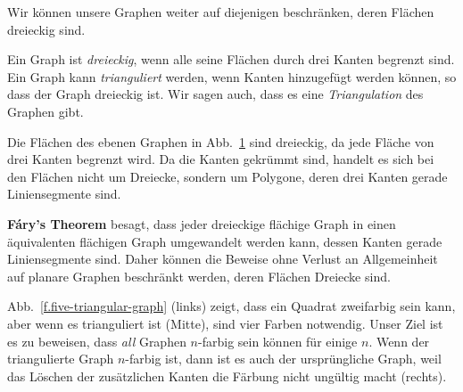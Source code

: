 \begin{figure}[t]
{
}
\label{f.five-planar-graph-map}
\label{f.five-planar-graph-graph}
\end{figure}

Wir können unsere Graphen weiter auf diejenigen beschränken, deren Flächen dreieckig sind.

\begin{definition}
Ein Graph ist \emph{dreieckig}, wenn alle seine Flächen durch drei Kanten begrenzt sind. Ein Graph kann \emph{trianguliert} werden, wenn Kanten hinzugefügt werden können, so dass der Graph dreieckig ist. Wir sagen auch, dass es eine \emph{Triangulation} des Graphen gibt.
\end{definition}

\begin{example}
Die Flächen des ebenen Graphen in Abb.~\ref{f.five-planar-graph-graph} sind dreieckig, da jede Fläche von drei Kanten begrenzt wird. Da die Kanten gekrümmt sind, handelt es sich bei den Flächen nicht um Dreiecke, sondern um Polygone, deren drei Kanten gerade Liniensegmente sind.
\end{example}

\begin{advanced}
\textbf{F\'{a}ry's Theorem} besagt, dass jeder dreieckige flächige Graph in einen äquivalenten flächigen Graph umgewandelt werden kann, dessen Kanten gerade Liniensegmente sind. Daher können die Beweise ohne Verlust an Allgemeinheit auf planare Graphen beschränkt werden, deren Flächen Dreiecke sind.
\end{advanced}

\begin{example}
Abb.~\ref{f.five-triangular-graph} (links) zeigt, dass ein Quadrat zweifarbig sein kann, aber wenn es trianguliert ist (Mitte), sind vier Farben notwendig. Unser Ziel ist es zu beweisen, dass \emph{all} Graphen $n$-farbig sein können für einige $n$. Wenn der triangulierte Graph $n$-farbig ist, dann ist es auch der ursprüngliche Graph, weil das Löschen der zusätzlichen Kanten die Färbung nicht ungültig macht (rechts).
\end{example}

